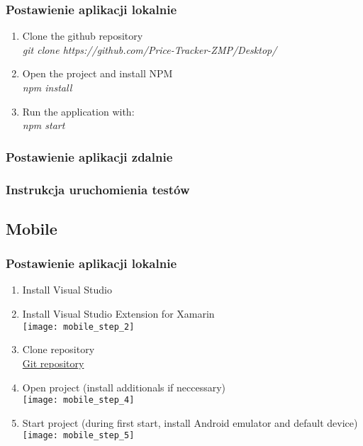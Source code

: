 \documentclass{article}
\begin{document}
        \subsubsection{Postawienie aplikacji lokalnie}
        \begin{enumerate}
            \item Clone the github repository\\
                        \emph{git clone https://github.com/Price-Tracker-ZMP/Desktop/} \\
            \item Open the project and install NPM\\
              \emph{npm install} \\
            \item Run the application with:\\
                \emph{npm start} \\
        \end{enumerate}
   
        \subsubsection{Postawienie aplikacji zdalnie}
        
        \subsubsection{Instrukcja uruchomienia testów}
        
    \subsection{Mobile}
        \subsubsection{Postawienie aplikacji lokalnie}
         \begin{enumerate}
            \item Install Visual Studio\\
            \item Install Visual Studio Extension for Xamarin\\
                \texttt{[image: mobile\_step\_2]}\\
            \item Clone repository\\
            \href{https://github.com/Price-Tracker-ZMP/Mobile.git}{Git repository}\\
            \item Open project (install additionals if neccessary)\\
                \texttt{[image: mobile\_step\_4]}\\
            \item Start project (during first start, install Android emulator and default device)\\
                \texttt{[image: mobile\_step\_5]}\\
        \end{enumerate}
       
\end{document}
